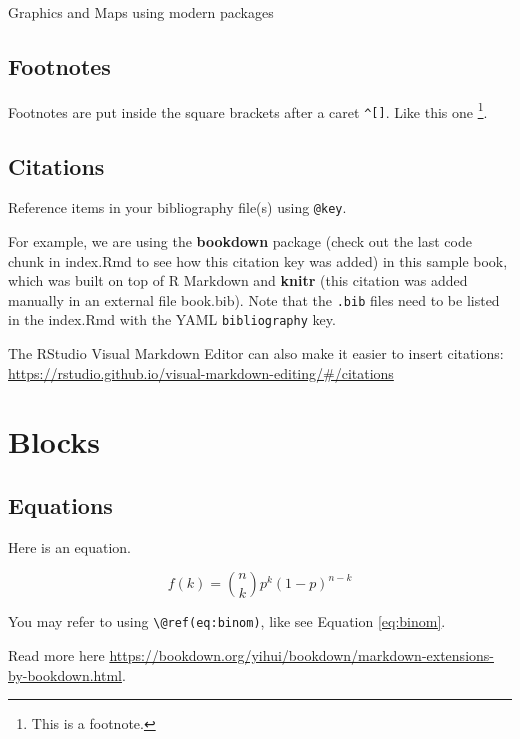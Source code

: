 \documentclass[
]{book}
\begin{document}
Graphics and Maps using modern packages

\hypertarget{footnotes}{%
\section{Footnotes}\label{footnotes}}

Footnotes are put inside the square brackets after a caret \texttt{\^{}{[}{]}}. Like this one \footnote{This is a footnote.}.

\hypertarget{citations}{%
\section{Citations}\label{citations}}

Reference items in your bibliography file(s) using \texttt{@key}.

For example, we are using the \textbf{bookdown} package \citep{R-bookdown} (check out the last code chunk in index.Rmd to see how this citation key was added) in this sample book, which was built on top of R Markdown and \textbf{knitr} \citep{xie2015} (this citation was added manually in an external file book.bib).
Note that the \texttt{.bib} files need to be listed in the index.Rmd with the YAML \texttt{bibliography} key.

The RStudio Visual Markdown Editor can also make it easier to insert citations: \url{https://rstudio.github.io/visual-markdown-editing/\#/citations}

\hypertarget{blocks}{%
\chapter{Blocks}\label{blocks}}

\hypertarget{equations}{%
\section{Equations}\label{equations}}

Here is an equation.

\begin{equation} 
  f\left(k\right) = \binom{n}{k} p^k\left(1-p\right)^{n-k}
  \label{eq:binom}
\end{equation}

You may refer to using \texttt{\textbackslash{}@ref(eq:binom)}, like see Equation \eqref{eq:binom}.

Read more here \url{https://bookdown.org/yihui/bookdown/markdown-extensions-by-bookdown.html}.
\end{document}

